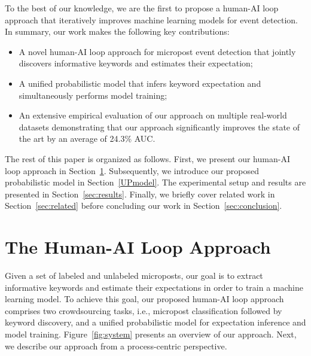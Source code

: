 \documentclass[letterpaper]{article}
\begin{document}
To the best of our knowledge, we are the first to propose a human-AI loop approach that iteratively improves machine learning models for event detection. In summary, our work makes the following key contributions:
\begin{itemize}
    \item A novel human-AI loop approach for micropost event detection %
    that jointly discovers informative keywords and estimates their expectation; 
    \item A unified probabilistic model that infers keyword expectation and simultaneously performs model training;
    \item An extensive empirical evaluation of our approach on multiple real-world datasets demonstrating that our approach significantly improves the state of the art by an average of 24.3\% AUC.
\end{itemize}

The rest of this paper is organized as follows. First, we present our human-AI loop approach in Section~\ref{sec:model}. Subsequently, we introduce our proposed probabilistic model in Section~\ref{UPmodel}. The experimental setup and results are presented in Section~\ref{sec:results}. Finally, we briefly cover related work in Section~\ref{sec:related} before concluding our work in Section~\ref{sec:conclusion}.

\section{The Human-AI Loop Approach}
\label{sec:model}
Given a set of labeled and unlabeled microposts, our goal is to extract informative keywords and estimate their expectations in order to train a machine learning model. To achieve this goal, our proposed human-AI loop approach comprises two crowdsourcing tasks, i.e., micropost classification followed by keyword discovery, and a unified probabilistic model for expectation inference and model training. Figure~\ref{fig:system} presents an overview of our approach. Next, we describe our approach from a process-centric perspective.
\end{document}

